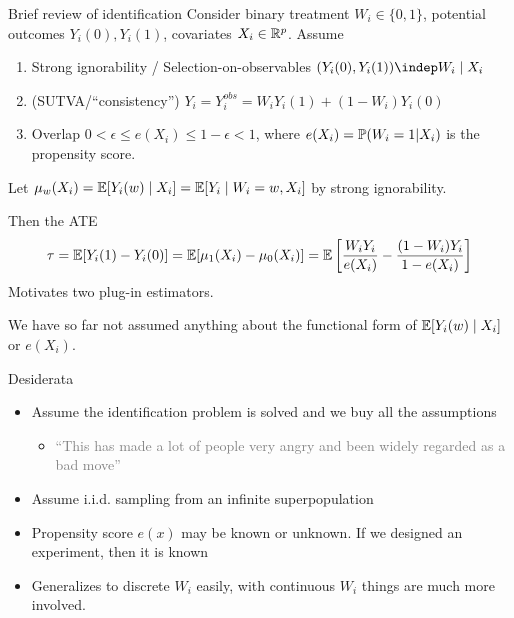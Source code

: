 \documentclass[10pt,aspectratio=169,handout]{beamer}
\theoremstyle{definition}
\newcommand{\light}[1]{\textcolor{gray}{#1}}
\begin{document}
\begin{frame}{Brief review of identification}
Consider binary treatment $W_i \in \{0,1\}$, potential outcomes $Y_i(0),
Y_i(1)$, covariates $X_i \in \R^p$. Assume \begin{enumerate}
  \item \alert{Strong ignorability} / Selection-on-observables $(Y_i(0),
  Y_i(1))
  \indep W_i \mid X_i$ 
  \item (SUTVA/``consistency'') $Y_i = Y_i^{obs} = W_iY_i(1) + (1-W_i) Y_i
  (0)$
  \item \alert{Overlap} $0 < \epsilon \le e(X_i) \le 1-\epsilon < 1$, where $e
  (X_i) = \P(W_i = 1|X_i)$ is the propensity score.
\end{enumerate}
Let $\mu_w(X_i) = \E[Y_i(w) \mid X_i] = \E[Y_i \mid W_i = w, X_i]$ by
strong ignorability.

Then the ATE\[
\tau = \E[Y_i(1)-Y_i(0)] = \E[\mu_1(X_i) - \mu_0(X_i)] = \E\bk{
\frac{W_iY_i}{e(X_i)} - \frac{(1-W_i)Y_i}{1-e(X_i)}}
\]
Motivates two plug-in estimators.

We have so far not assumed anything about the functional form of $\E[Y_i(w)
\mid X_i]$ or $e
(X_i)$. 
\end{frame}

\begin{frame}{Desiderata}
  \begin{itemize}
    \item Assume the identification problem is solved and we buy all the
    assumptions 
    \begin{itemize}
      \item \light{``This has made a lot of people very angry and been
      widely regarded as a bad move''}
    \end{itemize}
    \item Assume i.i.d. sampling from an infinite superpopulation
    \item Propensity score $e(x)$ may be known or unknown. If we designed
    an experiment, then it is known
    \item Generalizes to discrete $W_i$ easily, with continuous $W_i$ things are
much more involved.
  \end{itemize}
\end{frame}
\end{document}
